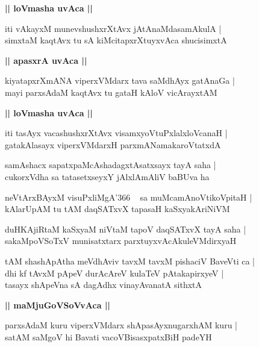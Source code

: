 \documentclass[twoside,12pt,openright]{book}
\newcounter{shloka}[chapter]
\def\uvaca#1{\centerline{{\large\textbf{#1}}}}
\begin{document}
\uvaca{|| loVmasha uvAca ||}

\begin{shloka}%
iti vAkayxM munevshushxrXtAvx jAtAnaMdasamAkulA |\\
simxtaM kaqtAvx tu sA kiMcitapxrXtuyxvAca shucisimxtA
\end{shloka}

\uvaca{|| apasxrA uvAca ||}

\begin{shloka}%
kiyatapxrXmANA viperxVMdarx tava saMdhAyx gatAnaGa |\\
mayi parxsAdaM kaqtAvx tu gataH kAloV vicArayxtAM 
\end{shloka}

\uvaca{|| loVmasha uvAca ||}

\begin{shloka}%
iti tasAyx vacashushxrXtAvx visamxyoVtuPxlalxloVcanaH |\\
gatakAlasayx viperxVMdarxH parxmANamakaroVtatxdA 
\end{shloka}

\begin{shloka}%
samAshacx sapatxpaMcAshadagxtAsatxsayx tayA saha |\\
cukorxVdha sa tatasetxseyxY jAlxlAmAliV baBUva ha 
\end{shloka}

\begin{shloka}%
neVtArxBAyxM visuPxliMgA\char'366 ~ sa muMcamAnoVtikoVpitaH |\\
kAlarUpAM tu tAM daqSATxvX tapasaH kaSxyakAriNiVM
\end{shloka}

\begin{shloka}%
duHKAjiRtaM kaSxyaM niVtaM tapoV daqSATxvX tayA saha |\\
sakaMpoVSoTxV munisatxtarx parxtuyxvAcAkuleVMdirxyaH
\end{shloka}

\begin{shloka}%
tAM shashApAtha meVdhAviv tavxM tavxM pishaciV BaveVti ca |\\
dhi kf tAvxM pApeV durAcAreV kulaTeV pAtakapirxyeV |\\
tasayx shApeVna sA dagAdhx vinayAvanatA sithxtA
\end{shloka}

\uvaca{|| maMjuGoVSoVvAca ||}

\begin{shloka}%
parxsAdaM kuru viperxVMdarx shApasAyxnugarxhAM kuru |\\
satAM saMgoV hi Bavati vacoVBisasxpatxBiH padeYH
\end{shloka}
\end{document}

